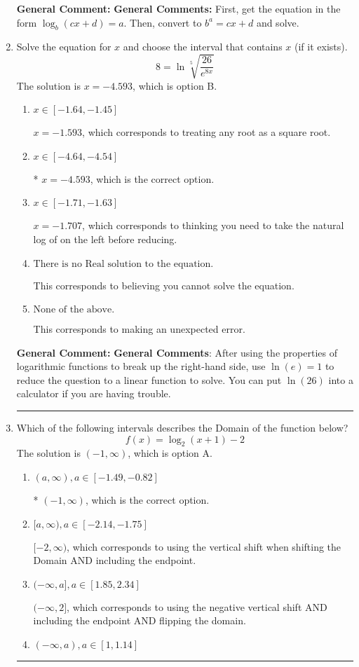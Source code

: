 \documentclass{extbook}[14pt]
\newcommand{\litem}[1]{\item #1

\rule{\textwidth}{0.4pt}}
\begin{document}
\begin{enumerate}
{\textbf{General Comment:} \textbf{General Comments:} First, get the equation in the form $\log_b{(cx+d)} = a$. Then, convert to $b^a = cx+d$ and solve.
}
\litem{
 Solve the equation for $x$ and choose the interval that contains $x$ (if it exists).
\[  8 = \ln{\sqrt[5]{\frac{26}{e^{8x}}}} \]The solution is \( x = -4.593 \), which is option B.\begin{enumerate}[label=\Alph*.]
\item \( x \in [-1.64, -1.45] \)

$x = -1.593$, which corresponds to treating any root as a square root.
\item \( x \in [-4.64, -4.54] \)

* $x = -4.593$, which is the correct option.
\item \( x \in [-1.71, -1.63] \)

$x = -1.707$, which corresponds to thinking you need to take the natural log of on the left before reducing.
\item \( \text{There is no Real solution to the equation.} \)

This corresponds to believing you cannot solve the equation.
\item \( \text{None of the above.} \)

This corresponds to making an unexpected error.
\end{enumerate}

\textbf{General Comment:} \textbf{General Comments}: After using the properties of logarithmic functions to break up the right-hand side, use $\ln(e) = 1$ to reduce the question to a linear function to solve. You can put $\ln(26)$ into a calculator if you are having trouble.
}
\litem{
Which of the following intervals describes the Domain of the function below?
\[ f(x) = \log_2{(x+1)}-2 \]The solution is \( (-1, \infty) \), which is option A.\begin{enumerate}[label=\Alph*.]
\item \( (a, \infty), a \in [-1.49, -0.82] \)

* $(-1, \infty)$, which is the correct option.
\item \( [a, \infty), a \in [-2.14, -1.75] \)

$[-2, \infty)$, which corresponds to using the vertical shift when shifting the Domain AND including the endpoint.
\item \( (-\infty, a], a \in [1.85, 2.34] \)

$(-\infty, 2]$, which corresponds to using the negative vertical shift AND including the endpoint AND flipping the domain.
\item \( (-\infty, a), a \in [1, 1.14] \)


\end{enumerate}}
\end{enumerate}
\end{document}
